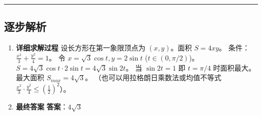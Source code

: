 \documentclass[UTF8]{ctexart}
\newenvironment{redenv}{\color{red}}{}
\newenvironment{detailedanalysis}{%
    \color{red}
    \begin{enumerate}[label=\textbf{第\arabic*步：}, leftmargin=*, align=left, itemsep=1.5ex]
}{%
    \end{enumerate}
}
\newcommand{\analysisrule}{\noindent\rule{\textwidth}{0.8pt}\vspace{-0.8em}}
\begin{document}
\begin{redenv}
\analysisrule
\subsection*{逐步解析}

\begin{detailedanalysis}
\item \textbf{详细求解过程}
设长方形在第一象限顶点为 $(x,y)$。面积 $S = 4xy$。
条件：$\frac{x^2}{3} + \frac{y^2}{4} = 1$。
令 $x = \sqrt{3}\cos t, y = 2\sin t$ ($t \in (0, \pi/2)$)。
$S = 4\sqrt{3}\cos t \cdot 2\sin t = 4\sqrt{3} \sin 2t$。
当 $\sin 2t = 1$ 即 $t = \pi/4$ 时面积最大。
最大面积 $S_{max} = 4\sqrt{3}$。
（也可以用拉格朗日乘数法或均值不等式 $\frac{x^2}{3} \cdot \frac{y^2}{4} \le (\frac{1}{2})^2$）。

\item \textbf{最终答案}
\textbf{答案}：$ 4\sqrt{3} $
\end{detailedanalysis}
\end{redenv}
\end{document}
